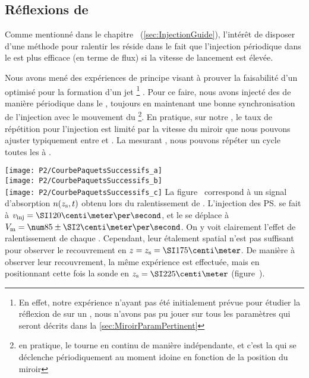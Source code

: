 \subsection{Réflexions de \patss} \label{sec:ResultatPaquetMultiple}
Comme mentionné dans le chapitre~ (\autoref{sec:InjectionGuide}), l'intérêt de disposer d'une méthode pour ralentir les \pats réside dans le fait que l'injection périodique dans le \gm est plus efficace (en terme de flux) si la vitesse de lancement est élevée.

Nous avons mené des expériences de principe visant à prouver la faisabilité d'un \setup optimisé pour la formation d'un jet%
\footnote{En effet, notre expérience n'ayant pas été initialement prévue pour étudier la réflexion de \pats sur un \mimo, nous n'avons pas pu jouer sur tous les paramètres qui seront décrits dans la \autoref{sec:MiroirParamPertinent}}%
. 
Pour ce faire, nous avons injecté des \pats de manière périodique dans le \gm, toujours en maintenant une bonne synchronisation de l'injection avec le mouvement du \mimo%
\footnote{en pratique, le \conv tourne en continu de manière indépendante, et c'est la \seqexp qui se déclenche périodiquement au moment idoine en fonction de la position du miroir}. En pratique, sur notre \setup, le taux de répétition pour l'injection est limité par la vitesse du miroir que nous pouvons ajuster typiquement entre  et . La \couconv mesurant , nous pouvons répéter un cycle toutes les  à .

\bfigss
\subfloat
{\label{fig:CourbePaquetsSuccessifs_a}
\texttt{[image: P2/CourbePaquetsSuccessifs\_a]}}\\
\RemonteUnPeuFig
\RemonteUnPeuFig
\RemonteUnPeuFig
\subfloat
{\label{fig:CourbePaquetsSuccessifs_b}
\texttt{[image: P2/CourbePaquetsSuccessifs\_b]}}\\
\RemonteUnPeuFig
\RemonteUnPeuFig
\RemonteUnPeuFig
\subfloat
{\label{fig:CourbePaquetsSuccessifs_c}
\texttt{[image: P2/CourbePaquetsSuccessifs\_c]}}
\label{fig:CourbePaquetsSuccessifs}
\efig
La figure~ correspond à un signal d'absorption $n({z_{\rm s}}, t)$ obtenu lors du ralentissement de \patss. L'injection des \ps se fait à $\vinj = \cmps{120}$, et le \mimo se déplace à $\Vmir = \cmpspm{85}{2}$.
On y voit clairement l'effet de ralentissement de chaque \pat. Cependant, leur étalement spatial n'est pas suffisant pour observer le recouvrement en $z=\zsonde=\cm{175}$. De manière à observer leur recouvrement, la même expérience est effectuée, mais en positionnant cette fois la sonde en $\zsonde=\cm{225}$ (figure~).

